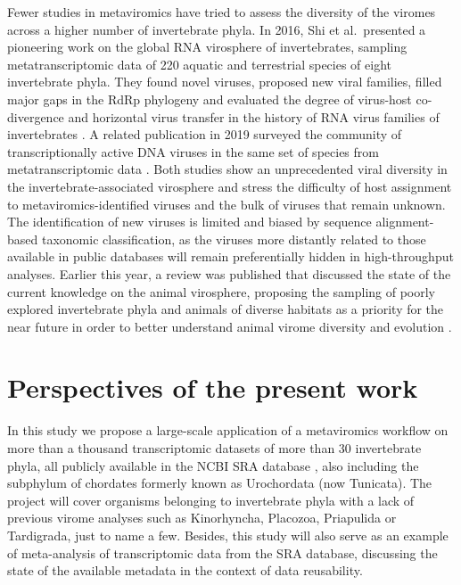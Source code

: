 \documentclass[
  openany]{book}
\begin{document}
Fewer studies in metaviromics have tried to assess the diversity of the viromes across a higher number of invertebrate phyla. In 2016, Shi et al.~presented a pioneering work on the global RNA virosphere of invertebrates, sampling metatranscriptomic data of 220 aquatic and terrestrial species of eight invertebrate phyla. They found novel viruses, proposed new viral families, filled major gaps in the RdRp phylogeny and evaluated the degree of virus-host co-divergence and horizontal virus transfer in the history of RNA virus families of invertebrates \autocite{Shi2016}. A related publication in 2019 surveyed the community of transcriptionally active DNA viruses in the same set of species from metatranscriptomic data \autocite{Porter2019}. Both studies show an unprecedented viral diversity in the invertebrate-associated virosphere and stress the difficulty of host assignment to metaviromics-identified viruses and the bulk of viruses that remain unknown. The identification of new viruses is limited and biased by sequence alignment-based taxonomic classification, as the viruses more distantly related to those available in public databases will remain preferentially hidden in high-throughput analyses. Earlier this year, a review was published that discussed the state of the current knowledge on the animal virosphere, proposing the sampling of poorly explored invertebrate phyla and animals of diverse habitats as a priority for the near future in order to better understand animal virome diversity and evolution \autocite{Harvey2022}.

\hypertarget{perspectives-of-the-present-work}{%
\section{Perspectives of the present work}\label{perspectives-of-the-present-work}}

In this study we propose a large-scale application of a metaviromics workflow on more than a thousand transcriptomic datasets of more than 30 invertebrate phyla, all publicly available in the NCBI SRA database \autocite{Leinonen2011}, also including the subphylum of chordates formerly known as Urochordata (now Tunicata). The project will cover organisms belonging to invertebrate phyla with a lack of previous virome analyses such as Kinorhyncha, Placozoa, Priapulida or Tardigrada, just to name a few. Besides, this study will also serve as an example of meta-analysis of transcriptomic data from the SRA database, discussing the state of the available metadata in the context of data reusability.
\end{document}

